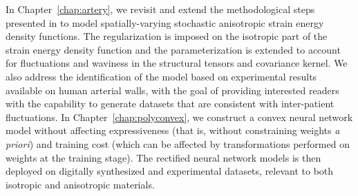 In Chapter~\ref{chap:artery}, we revisit and extend the methodological steps presented in \cite{STABER201894} to model spatially-varying stochastic anisotropic strain energy density functions. The regularization is imposed on the isotropic part of the strain energy density function and the parameterization is extended to account for fluctuations and waviness in the structural tensors and covariance kernel. We also address the identification of the model based on experimental results available on human arterial walls, with the goal of providing interested readers with the capability to generate datasets that are consistent with inter-patient fluctuations. In Chapter~\ref{chap:polyconvex}, we construct a convex neural network model without affecting expressiveness (that is, without constraining weights \textit{a priori}) and training cost (which can be affected by transformations performed on weights at the training stage). The rectified neural network models is then deployed on digitally synthesized and experimental datasets, relevant to both isotropic and anisotropic materials.